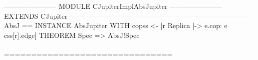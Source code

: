 \documentclass{article}
\begin{document}
\begin{tla}
----------------------- MODULE CJupiterImplAbsJupiter -----------------------
EXTENDS CJupiter
-----------------------------------------------------------------------------
AbsJ == INSTANCE AbsJupiter
            WITH copss <- [r \in Replica |-> {e.cop: e \in css[r].edge}]
THEOREM Spec => AbsJ!Spec
=============================================================================
\end{tla}
\end{document}
